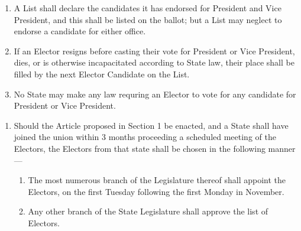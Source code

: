 \documentclass{article}
\begin{document}
\begin{enumerate}
        \item A List shall declare the candidates it has endorsed for President and Vice President, and this shall be listed on the ballot; but a List may neglect to endorse a candidate for either office.
        \item If an Elector resigns before casting their vote for President or Vice President, dies, or is otherwise incapacitated according to State law, their place shall be filled by the next Elector Candidate on the List.
        \item No State may make any law requring an Elector to vote for any candidate for President or Vice President.
    \end{enumerate}
    \begin{enumerate}   
        \item Should the Article proposed in Section 1 be enacted, and a State shall have joined the union within 3 months proceeding a scheduled meeting of the Electors, the Electors from that state shall be chosen in the following manner---
        \begin{enumerate}
            \item The most numerous branch of the Legislature thereof shall appoint the Electors, on the first Tuesday following the first Monday in November.
            \item Any other branch of the State Legislature shall approve the list of Electors.
        \end{enumerate}
    \end{enumerate}
\end{document}
